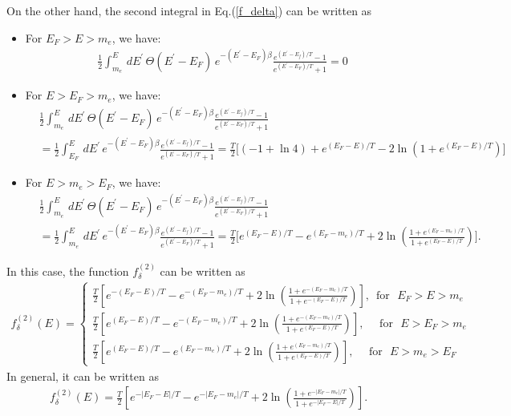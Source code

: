 \documentclass[onecolumn,preprintnumbers,amsmath,amssymb]{revtex4}
\begin{document}
On the other hand, the second integral in Eq.(\ref{f_delta}) can be written as
\begin{itemize}
 \item For $E_F>E>m_e$, we have:
\begin{align}
&\frac{1}{2}\int^{E}_{m_e}\,dE^\prime\,\Theta(E^\prime-E_F)\,e^{-(E^\prime-E_F)\beta}\frac{e^{(E^\prime-E_f)/T}-1}{e^{(E^\prime-E_F)/T}+1}=0
\end{align}
  \item For $E>E_F>m_e$, we have:
\begin{align}
&\frac{1}{2}\int^{E}_{m_e}\,dE^\prime\,\Theta(E^\prime-E_F)\,e^{-(E^\prime-E_F)\beta}\frac{e^{(E^\prime-E_f)/T}-1}{e^{(E^\prime-E_F)/T}+1}\\
&=\frac{1}{2}\int^{E}_{E_F}\,dE^\prime\,e^{-(E^\prime-E_F)\beta}\frac{e^{(E^\prime-E_f)/T}-1}{e^{(E^\prime-E_F)/T}+1}=\frac{T}{2}\bigg[(-1+\ln4)+e^{(E_F-E)/T} -2\ln{\left(1+e^{(E_F-E)/T}\right)}\bigg]
\end{align}
  \item For $E>m_e>E_F$, we have:
\begin{align}
&\frac{1}{2}\int^{E}_{m_e}\,dE^\prime\,\Theta(E^\prime-E_F)\,e^{-(E^\prime-E_F)\beta}\frac{e^{(E^\prime-E_f)/T}-1}{e^{(E^\prime-E_F)/T}+1}\\
&=\frac{1}{2}\int^{E}_{m_e}\,dE^\prime\,e^{-(E^\prime-E_F)\beta}\frac{e^{(E^\prime-E_f)/T}-1}{e^{(E^\prime-E_F)/T}+1}=\frac{T}{2}\bigg[e^{(E_F-E)/T}-e^{(E_F-m_e)/T}+2\ln{\left(\frac{1+e^{(E_F-m_e)/T}}{1+e^{(E_F-E)/T}}\right)}\bigg].
\end{align}
\end{itemize}
In this case, the function  $f^{(2)}_\delta$ can be written as
\begin{align}
f^{(2)}_\delta(E)=\left\{\begin{array}{c}
\frac{T}{2}\left[e^{-(E_F-E)/T}-e^{-(E_F-m_e)/T}+2\ln{\left(\frac{1+e^{-(E_F-m_e)/T}}{1+e^{-(E_F-E)/T}}\right)}\right],\,\,\,\mathrm{for}\,\,\,\,E_F>E>m_e \\ 
\frac{T}{2}\left[e^{(E_F-E)/T}-e^{-(E_F-m_e)/T}+2\ln{\left(\frac{1+e^{-(E_F-m_e)/T}}{1+e^{(E_F-E)/T}}\right)}\right],\,\,\,\,\,\,\,\,\mathrm{for}\,\,\,\,E>E_F>m_e \\
\frac{T}{2}\left[e^{(E_F-E)/T}-e^{(E_F-m_e)/T}+2\ln{\left(\frac{1+e^{(E_F-m_e)/T}}{1+e^{(E_F-E)/T}}\right)}\right],\,\,\,\,\,\,\,\,\mathrm{for}\,\,\,\,E>m_e>E_F
\end{array}\right.
\end{align}
In general, it can be written as
\begin{align}
f^{(2)}_\delta(E)=\frac{T}{2}\left[e^{-|E_F-E|/T}-e^{-|E_F-m_e|/T}+2\ln{\left(\frac{1+e^{-|E_F-m_e|/T}}{1+e^{-|E_F-E|/T}}\right)}\right].
\end{align}
\end{document}
